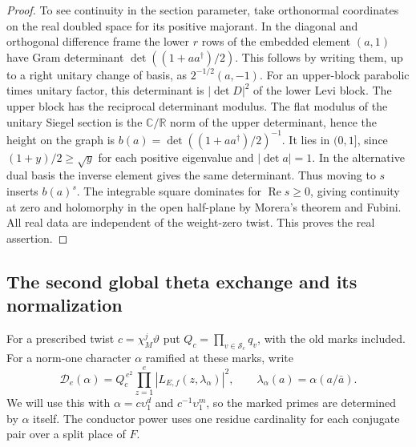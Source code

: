 \documentclass[a4paper,11pt]{article}
\theoremstyle{definition}
\theoremstyle{remark}
\numberwithin{equation}{section}
\begin{document}
\begin{proof}
To see continuity in the section parameter, take orthonormal
coordinates on the real doubled space for its positive
majorant. In the diagonal and orthogonal difference frame
the lower \(r\) rows of the embedded element \((a,1)\) have
Gram determinant \(\det((1+aa^\dagger)/2)\). This follows by
writing them, up to a right unitary change of basis, as
\(2^{-1/2}(a,-1)\). For an upper-block parabolic times
unitary factor, this determinant is \(|\det D|^2\) of the
lower Levi block. The upper block has the reciprocal determinant
modulus. The flat modulus of the unitary Siegel section is
the \(\mathbb C/\mathbb R\) norm of the upper determinant, hence
the height on the graph is \(b(a)=\det((1+aa^\dagger)/2)^{-1}\).
It lies in \((0,1]\), since \((1+y)/2\ge\sqrt y\) for each
positive eigenvalue and \(|\det a|=1\). In the alternative
dual basis the inverse element gives the same determinant.
Thus moving to \(s\) inserts \(b(a)^s\). The integrable square
dominates for \(\operatorname{Re}s\ge0\), giving continuity at
zero and holomorphy in the open half-plane by Morera's theorem
and Fubini. All real data are independent of the weight-zero
twist. This proves the real assertion.
\end{proof}
\clearpage

\subsection{The second global theta exchange and its normalization}
\label{sec:secondglobal833}
For a prescribed twist \(c=\chi_M^j\vartheta\) put
\(Q_c=\prod_{v\in\mathcal S_c}q_v\), with the old marks
included. For a norm-one character \(\alpha\) ramified at
these marks, write
\[
 \mathcal D_e(\alpha)=Q_c^{\,e^2}
    \prod_{z=1}^e|L_{E,f}(z,\lambda_\alpha)|^2,\qquad
 \lambda_\alpha(a)=\alpha(a/\bar a).
\]
We will use this with \(\alpha=c\upsilon_1^d\) and
\(c^{-1}\upsilon_1^m\), so the marked primes are determined
by \(\alpha\) itself. The conductor power uses one residue
cardinality for each conjugate pair over a split place of \(F\).
\end{document}
